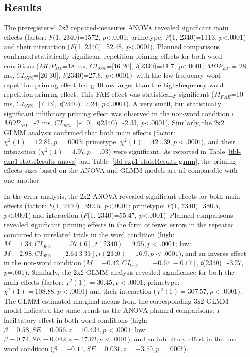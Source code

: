 \documentclass[
]{interact}
\begin{document}
\subsection{Results}\label{sec-exp1-results}

The preregistered 2x2 repeated-measures ANOVA revealed significant main
effects (factor: \emph{F}(1, 2340)=1572, \emph{p}\textless.0001;
primetype: \emph{F}(1, 2340)=1113, \emph{p}\textless.0001) and their
interaction (\emph{F}(1, 2340)=52.48, \emph{p}\textless.0001). Planned
comparisons confirmed statistically significant repetition priming
effects for both word conditions (\(MOP_{HF}\)=18 ms,
\(CI_{95\%}\)={[}16 20{]}, \emph{t}(2340)=19.7, \emph{p}\textless.0001;
\(MOP_{LF}\) = 28 ms, \(CI_{95\%}\)={[}26 30{]}, \emph{t}(2340)=27.8,
\emph{p}\textless.0001), with the low-frequency word repetition priming
effect being 10 ms larger than the high-frequency word repetition
priming effect. This FAE effect was statistically significant
(\(M_{FAE}\)=10 ms, \(CI_{95\%}\)={[}7 13{]}, \emph{t}(2340)=7.24,
\emph{p}\textless.0001). A very small, but statistically significant
inhibitory priming effect was observed in the non-word condition
(\(MOP_{NW}\)=-2 ms, \(CI_{95\%}\)={[}-4 0{]}, \emph{t}(2340)=-2.33,
\emph{p}\textless.0001). Similarly, the 2x2 GLMM analysis confirmed that
both main effects (factor: \(\chi^2(1)=12.89, p=.0003\); primetype:
\(\chi^2(1)=421.39, p<.0001\)), and their interaction
(\(\chi^2(1)=4.97, p=.03\)) were significant. As reported in
Table~\ref{tbl-exp1-statsResults-anova} and
Table~\ref{tbl-exp1-statsResults-glmm}, the priming effects sizes based
on the ANOVA and GLMM models are all comparable with one another.

In the error analysis, the 2x2 ANOVA revealed significant effects for
both main effects (factor: \emph{F}(1, 2340)=392.5,
\emph{p}\textless.0001; primetype: \emph{F}(1, 2340)=380.5,
\emph{p}\textless.0001) and interaction (\emph{F}(1, 2340)=55.47,
\emph{p}\textless.0001). Planned comparisons revealed significant
priming effects in the form of fewer errors in the repeated compared to
unrelated trials in the word condition (high:
\(M = 1.34, CI_{95\%}=[1.07 ~ 1.6], t(2340)=9.95, p<.0001\); low:
\(M = 2.98, CI_{95\%} = [2.64 ~ 3.33], t(2340)=16.9, p<.0001\)), and an
inverse effect in the non-word condition
(\(M = -0.42, CI_{95\%} = [-0.67 ~ -0.17]\), \emph{t}(2340)=-3.27,
\emph{p}=.001). Similarly, the 2x2 GLMM analysis revealed significance
for both the main effects (factor: \(\chi^2(1)=30.45, p<.0001\);
primetype: \(\chi^2(1)=108.88, p<.0001\)) and their interaction
(\(\chi^2(1)=307.57, p<.0001\)). The GLMM estimated marginal means from
the corresponding 3x2 GLMM model indicated the same trends as the ANOVA
planned comparisons: a facilitatory effect in both word conditions
(high: \(\beta = 0.58, SE = 0.056, z=10.434, p<.0001\); low:
\(\beta = 0.74, SE = 0.042, z=17.62, p<.0001\)), and an inhibitory
effect in the non-word condition
(\(\beta = -0.11, SE = 0.031, z=-3.50, p=.0005\)).
\end{document}

